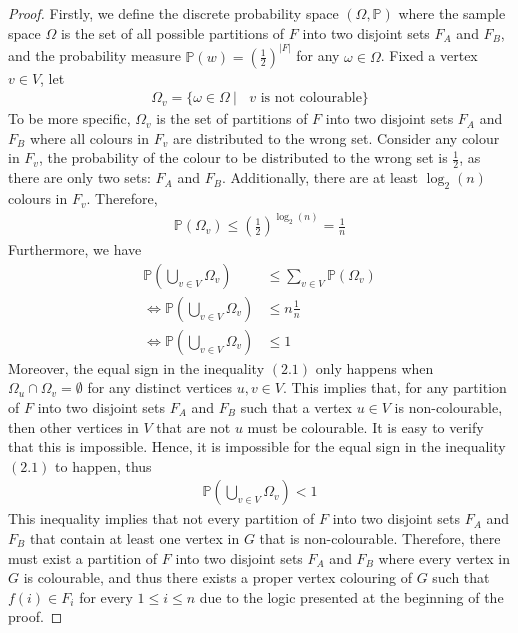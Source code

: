\begin{proof}
  Firstly, we define the discrete probability space $(\Omega, \mathbb{P})$ where the sample space $\Omega$ is the set of all possible partitions of $F$ into two disjoint sets $F_{A}$ and $F_{B}$, and the probability measure $\mathbb{P}(w) = (\frac{1}{2})^{|F|}$ for any $\omega \in \Omega$. Fixed a vertex $v \in V$, let 
  \begin{align*}
    \Omega_{v} = \{\omega \in \Omega \ | \ \text{ $v$ is not colourable}\}
  \end{align*}
  To be more specific, $\Omega_{v}$ is the set of partitions of $F$ into two disjoint sets $F_{A}$ and $F_{B}$ where all colours in $F_{v}$ are distributed to the wrong set. Consider any colour in $F_{v}$, the probability of the colour to be distributed to the wrong set is $\frac{1}{2}$, as there are only two sets: $F_{A}$ and $F_{B}$. Additionally, there are at least $\log_{2}(n)$ colours in $F_{v}$. Therefore,
  \begin{align*}
    \mathbb{P}(\Omega_{v}) \leq \left( \frac{1}{2} \right)^{\log_{2}(n)} = \frac{1}{n}   
  \end{align*}
  Furthermore, we have
  \begin{align*}
    \mathbb{P}(\bigcup_{v \in V} \Omega_{v}) &\leq \sum_{v \in V} \mathbb{P}(\Omega_{v}) \\
    \Leftrightarrow \mathbb{P}(\bigcup_{v \in V} \Omega_{v}) &\leq n \frac{1}{n} \\
    \Leftrightarrow \mathbb{P}(\bigcup_{v \in V} \Omega_{v}) &\leq 1 \tag{2.1}
  \end{align*}
  Moreover, the equal sign in the inequality $(2.1)$ only happens when $\Omega_{u} \cap \Omega_{v} = \emptyset$ for any distinct vertices $u,v \in V$. This implies that, for any partition of $F$ into two disjoint sets $F_{A}$ and $F_{B}$ such that a vertex $u \in V$ is non-colourable, then other vertices in $V$ that are not $u$ must be colourable. It is easy to verify that this is impossible. Hence, it is impossible for the equal sign in the inequality $(2.1)$ to happen, thus 
  \begin{align*}
    \mathbb{P}(\bigcup_{v \in V} \Omega_{v}) < 1
  \end{align*}
  This inequality implies that not every partition of $F$ into two disjoint sets $F_{A}$ and $F_{B}$ that contain at least one vertex in $G$ that is non-colourable. Therefore, there must exist a partition of $F$ into two disjoint sets $F_{A}$ and $F_{B}$ where every vertex in $G$ is colourable, and thus there exists a proper vertex colouring of $G$ such that $f(i) \in F_{i}$ for every $1 \leq i \leq n$ due to the logic presented at the beginning of the proof.
\end{proof}

